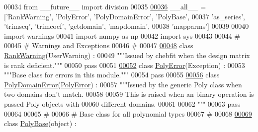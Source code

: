 \begin{DoxyCode}
00034 \textcolor{keyword}{from} \_\_future\_\_ \textcolor{keyword}{import} division
00035 
\hypertarget{polyutils_8py_source_l00036}{}\hyperlink{namespacepyneb_1_1utils_1_1polyutils_a5e54a45bb5c6fa4444f663a0b0da0e1f}{00036} \_\_all\_\_ = [\textcolor{stringliteral}{'RankWarning'}, \textcolor{stringliteral}{'PolyError'}, \textcolor{stringliteral}{'PolyDomainError'}, \textcolor{stringliteral}{'PolyBase'},
00037            \textcolor{stringliteral}{'as\_series'}, \textcolor{stringliteral}{'trimseq'}, \textcolor{stringliteral}{'trimcoef'}, \textcolor{stringliteral}{'getdomain'}, \textcolor{stringliteral}{'mapdomain'},
00038            \textcolor{stringliteral}{'mapparms'}]
00039 
00040 \textcolor{keyword}{import} warnings
00041 \textcolor{keyword}{import} numpy \textcolor{keyword}{as} np
00042 \textcolor{keyword}{import} sys
00043 
00044 \textcolor{comment}{#}
00045 \textcolor{comment}{# Warnings and Exceptions}
00046 \textcolor{comment}{#}
00047 
\hypertarget{polyutils_8py_source_l00048}{}\hyperlink{classpyneb_1_1utils_1_1polyutils_1_1_rank_warning}{00048} \textcolor{keyword}{class }\hyperlink{classpyneb_1_1utils_1_1polyutils_1_1_rank_warning}{RankWarning}(UserWarning) :
00049     \textcolor{stringliteral}{"""Issued by chebfit when the design matrix is rank deficient."""}
00050     \textcolor{keywordflow}{pass}
00051 
\hypertarget{polyutils_8py_source_l00052}{}\hyperlink{classpyneb_1_1utils_1_1polyutils_1_1_poly_error}{00052} \textcolor{keyword}{class }\hyperlink{classpyneb_1_1utils_1_1polyutils_1_1_poly_error}{PolyError}(Exception) :
00053     \textcolor{stringliteral}{"""Base class for errors in this module."""}
00054     \textcolor{keywordflow}{pass}
00055 
\hypertarget{polyutils_8py_source_l00056}{}\hyperlink{classpyneb_1_1utils_1_1polyutils_1_1_poly_domain_error}{00056} \textcolor{keyword}{class }\hyperlink{classpyneb_1_1utils_1_1polyutils_1_1_poly_domain_error}{PolyDomainError}(\hyperlink{classpyneb_1_1utils_1_1polyutils_1_1_poly_error}{PolyError}) :
00057     \textcolor{stringliteral}{"""Issued by the generic Poly class when two domains don't match.}
00058 \textcolor{stringliteral}{}
00059 \textcolor{stringliteral}{    This is raised when an binary operation is passed Poly objects with}
00060 \textcolor{stringliteral}{    different domains.}
00061 \textcolor{stringliteral}{}
00062 \textcolor{stringliteral}{    """}
00063     \textcolor{keywordflow}{pass}
00064 
00065 \textcolor{comment}{#}
00066 \textcolor{comment}{# Base class for all polynomial types}
00067 \textcolor{comment}{#}
00068 
\hypertarget{polyutils_8py_source_l00069}{}\hyperlink{classpyneb_1_1utils_1_1polyutils_1_1_poly_base}{00069} \textcolor{keyword}{class }\hyperlink{classpyneb_1_1utils_1_1polyutils_1_1_poly_base}{PolyBase}(object) :

\end{DoxyCode}
